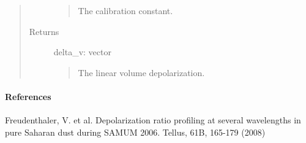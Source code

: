 \documentclass[letterpaper,10pt,english]{sphinxmanual}
\begin{document}
\begin{fulllineitems}
\begin{quote}
\begin{description}
\begin{quote}
The calibration constant.
\end{quote}

\item[{Returns}] \leavevmode
delta\_v: vector
\begin{quote}

The linear volume depolarization.
\end{quote}

\end{description}\end{quote}
\paragraph{References}

Freudenthaler, V. et al. Depolarization ratio profiling at several wavelengths in pure
Saharan dust during SAMUM 2006. Tellus, 61B, 165-179 (2008)

\end{fulllineitems}

\end{document}
